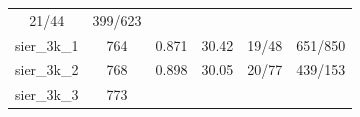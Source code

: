 \documentclass[twoside,12pt,final]{ucthesis-CA2012}
\begin{document}
\begin{ucmainmatter}
\begin{longtable}[]{@{}cccccc@{}}
\begin{minipage}[t]{0.18\columnwidth}
21/44\strut
\end{minipage} & \begin{minipage}[t]{0.22\columnwidth}\centering\strut
399/623\strut
\end{minipage}\tabularnewline
\begin{minipage}[t]{0.11\columnwidth}\centering\strut
sier\_3k\_1\strut
\end{minipage} & \begin{minipage}[t]{0.07\columnwidth}\centering\strut
764\strut
\end{minipage} & \begin{minipage}[t]{0.11\columnwidth}\centering\strut
0.871\strut
\end{minipage} & \begin{minipage}[t]{0.13\columnwidth}\centering\strut
30.42\strut
\end{minipage} & \begin{minipage}[t]{0.18\columnwidth}\centering\strut
19/48\strut
\end{minipage} & \begin{minipage}[t]{0.22\columnwidth}\centering\strut
651/850\strut
\end{minipage}\tabularnewline
\begin{minipage}[t]{0.11\columnwidth}\centering\strut
sier\_3k\_2\strut
\end{minipage} & \begin{minipage}[t]{0.07\columnwidth}\centering\strut
768\strut
\end{minipage} & \begin{minipage}[t]{0.11\columnwidth}\centering\strut
0.898\strut
\end{minipage} & \begin{minipage}[t]{0.13\columnwidth}\centering\strut
30.05\strut
\end{minipage} & \begin{minipage}[t]{0.18\columnwidth}\centering\strut
20/77\strut
\end{minipage} & \begin{minipage}[t]{0.22\columnwidth}\centering\strut
439/153\strut
\end{minipage}\tabularnewline
\begin{minipage}[t]{0.11\columnwidth}\centering\strut
sier\_3k\_3\strut
\end{minipage} & \begin{minipage}[t]{0.07\columnwidth}\centering\strut
773\strut
\end{minipage} & \begin{minipage}[t]{0.11\columnwidth}\centering\strut

\end{minipage}
\end{longtable}
\end{ucmainmatter}
\end{document}

